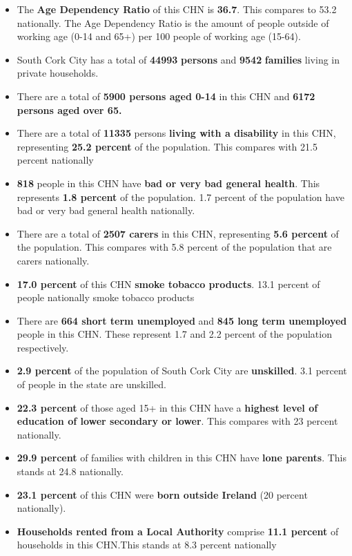 \documentclass{article}
\begin{document}
\begin{itemize}

\item The \textbf{Age Dependency Ratio} of this CHN is  \textbf{36.7}. This compares to 53.2 nationally. The Age Dependency Ratio is the amount of people outside of working age (0-14 and 65+) per 100 people of working age (15-64). 

\item South Cork City has a total of \textbf{\num{44993}} \textbf{persons} and  \textbf{\num{9542}} \textbf{families} living in private households.

\item There are a total of \textbf{\num{5900} persons aged 0-14} in this CHN and \textbf{\num{6172} persons aged over 65.} 

\item There are a total of \textbf{\num{11335}} persons \textbf{living with a disability} in this CHN, representing \textbf{25.2 percent} of the population. This compares with  21.5 percent nationally

\item \textbf{\num{818}} people in this CHN have \textbf{bad or very bad general health}. This represents \textbf{1.8 percent} of the population. 1.7 percent of the population have bad or very bad general health nationally. 

\item There are a total of \textbf{\num{2507} carers} in this CHN, representing \textbf{5.6 percent} of the population. This compares with 5.8 percent of the population that are carers nationally. 

\item \textbf{17.0 percent} of this CHN \textbf{smoke tobacco products}. 13.1 percent of people nationally smoke tobacco products

\item There are \textbf{\num{664} short term unemployed} and \textbf{\num{845} long term unemployed} people in this CHN. These represent 1.7 and 2.2 percent of the population respectively.

\item  \textbf{2.9 percent} of the population of South Cork City are \textbf{unskilled}. 3.1 percent of people in the state are unskilled.

\item \textbf{22.3 percent} of those aged 15+ in this CHN have a \textbf{highest level of education of lower secondary or lower}. This compares with 23 percent nationally. 

\item \textbf{29.9 percent} of families with children in this CHN have \textbf{lone parents}. This stands at 24.8 nationally.

\item \textbf{23.1 percent} of this CHN were \textbf{born outside Ireland} (20 percent nationally).

\item \textbf{Households rented from a Local Authority} comprise \textbf{11.1 percent} of households in this CHN.This stands at 8.3 percent nationally

\end{itemize}
\end{document}
